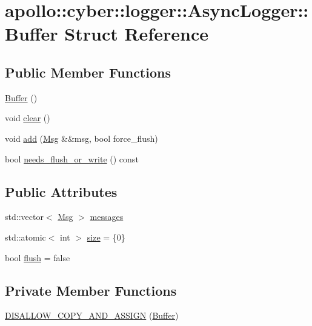 \hypertarget{structapollo_1_1cyber_1_1logger_1_1AsyncLogger_1_1Buffer}{\section{apollo\-:\-:cyber\-:\-:logger\-:\-:Async\-Logger\-:\-:Buffer Struct Reference}
\label{structapollo_1_1cyber_1_1logger_1_1AsyncLogger_1_1Buffer}
}
\subsection*{Public Member Functions}
\begin{DoxyCompactItemize}
\item 
\hyperlink{structapollo_1_1cyber_1_1logger_1_1AsyncLogger_1_1Buffer_ab25f705c60cb7b6a45d208dbb1fa1b40}{Buffer} ()
\item 
void \hyperlink{structapollo_1_1cyber_1_1logger_1_1AsyncLogger_1_1Buffer_aa191b2df2565ae9b3d937a92b83fbd7e}{clear} ()
\item 
void \hyperlink{structapollo_1_1cyber_1_1logger_1_1AsyncLogger_1_1Buffer_ae00006eb63bc2e3248c8029c65adabee}{add} (\hyperlink{structapollo_1_1cyber_1_1logger_1_1AsyncLogger_1_1Msg}{Msg} \&\&msg, bool force\-\_\-flush)
\item 
bool \hyperlink{structapollo_1_1cyber_1_1logger_1_1AsyncLogger_1_1Buffer_aa8102cd3065cf8a45bcbeae371ecae9e}{needs\-\_\-flush\-\_\-or\-\_\-write} () const 
\end{DoxyCompactItemize}
\subsection*{Public Attributes}
\begin{DoxyCompactItemize}
\item 
std\-::vector$<$ \hyperlink{structapollo_1_1cyber_1_1logger_1_1AsyncLogger_1_1Msg}{Msg} $>$ \hyperlink{structapollo_1_1cyber_1_1logger_1_1AsyncLogger_1_1Buffer_a8b95c833f3fccbe32a8b1dd9a814c018}{messages}
\item 
std\-::atomic$<$ int $>$ \hyperlink{structapollo_1_1cyber_1_1logger_1_1AsyncLogger_1_1Buffer_a48e0490978aeaa590cbe4a8697926a9a}{size} = \{0\}
\item 
bool \hyperlink{structapollo_1_1cyber_1_1logger_1_1AsyncLogger_1_1Buffer_a56de07f3921488c1085e807ad40fda2c}{flush} = false
\end{DoxyCompactItemize}
\subsection*{Private Member Functions}
\begin{DoxyCompactItemize}
\item 
\hyperlink{structapollo_1_1cyber_1_1logger_1_1AsyncLogger_1_1Buffer_a9fb640a7e65ad95e95df262b521b4b82}{D\-I\-S\-A\-L\-L\-O\-W\-\_\-\-C\-O\-P\-Y\-\_\-\-A\-N\-D\-\_\-\-A\-S\-S\-I\-G\-N} (\hyperlink{structapollo_1_1cyber_1_1logger_1_1AsyncLogger_1_1Buffer}{Buffer})
\end{DoxyCompactItemize}


